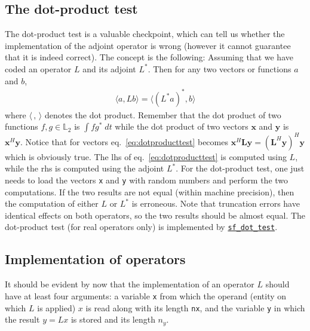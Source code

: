 \subsection{The dot-product test}\label{sec:dot-product test}
The dot-product test is a valuable checkpoint, which can tell us whether the implementation of the adjoint operator is wrong (however it cannot guarantee that it is indeed correct). The concept is the following: Assuming that we have coded an operator $L$ and its adjoint $L^*$. Then for any two vectors or functions $a$ and $b$,
\begin{gather}\label{eq:dotproducttest}
	\langle a,Lb\rangle = \langle(L^*a)^*,b\rangle
\end{gather} 
where $\langle\,,\,{}\rangle$ denotes the dot product. Remember that the dot product of two functions $f,g\in \mathbb{L}_2$ is $\int fg^*\;dt$ while the dot product of two vectors $\mathbf{x}$ and $\mathbf{y}$ is $\mathbf{x}^H\mathbf{y}$. Notice that for vectors eq.~\eqref{eq:dotproducttest} becomes $\mathbf{x}^H\mathbf{Ly} = (\mathbf{L}^H\mathbf{y})^H\mathbf{y}$ which is obviously true.
The lhs of eq.~\eqref{eq:dotproducttest} is computed using $L$, while the rhs is computed using the adjoint $L^*$. For the dot-product test, one just needs to load the vectors \texttt{x} and \texttt{y} with random numbers and perform the two computations. If the two results are not equal (within machine precision), then the computation of either $L$ or $L^*$ is erroneous. Note that truncation errors have identical effects on both operators, so the two results should be almost equal. The dot-product test (for real operators only) is implemented by \hyperref[sec:sf_dot_test]{\texttt{sf\_dot\_test}}.

\subsection{Implementation of operators}
It should be evident by now that the implementation of an operator $L$ should have at least four arguments: a variable \texttt{x} from which the operand (entity on which $L$ is applied) $x$ is read along with its length \texttt{nx}, and the variable \texttt{y} in which the result $y=Lx$ is stored and its length $n_y$. 

